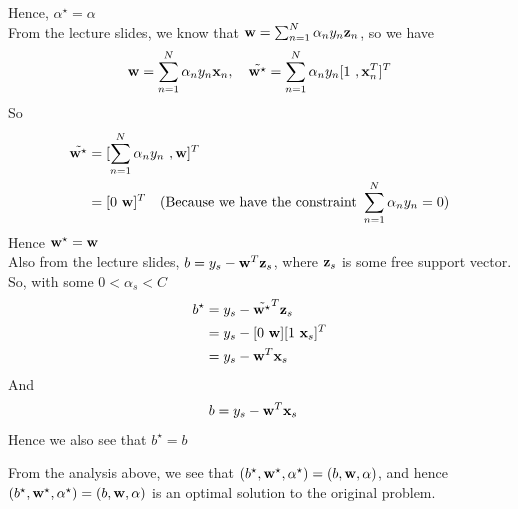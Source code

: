 \documentclass[11pt]{article}
\theoremstyle{definition}
\begin{document}
Hence, $\alpha^\star = \alpha$ \\
From the lecture slides, we know that $\vb{w} = \sum^N_{n = 1}\alpha_ny_n\vb{z}_n$, so we have
\[
  \vb{w} = \sum^N_{n = 1}\alpha_ny_n\vb{x}_n,\quad\tilde{\vb{w}^\star} = \sum^N_{n = 1}\alpha_ny_n[1\ ,\vb{x}_n^T]^T
\]
So 
\begin{align*}
  \tilde{\vb{w}^\star} &= [\sum^N_{n = 1}\alpha_ny_n\ ,\vb{w}]^T \\ 
  &= [0\ \vb{w}]^T\quad(\text{Because we have the constraint }\sum^N_{n = 1}\alpha_ny_n = 0)
\end{align*}
Hence $\vb{w}^\star = \vb{w}$ \\
Also from the lecture slides, $b = y_s - \vb{w}^T\vb{z}_s$, where $\vb{z}_s$ is some free support vector. \\ 
So, with some $0 < \alpha_s < C$ 
\begin{align*}
  b^\star &= y_s - \tilde{\vb{w}^\star}^T\vb{z}_s \\ 
  &= y_s - [0\ \vb{w}][1\ \vb{x}_s]^T \\ 
  &= y_s - \vb{w}^T\vb{x}_s
\end{align*}
And 
\begin{align*}
  b &= y_s - \vb{w}^T\vb{x}_s
\end{align*}
Hence we also see that $b^\star = b$
\par 
From the analysis above, we see that $(b^\star, \vb{w}^\star ,\alpha^\star) = (b, \vb{w}, \alpha)$, and hence $(b^\star, \vb{w}^\star ,\alpha^\star) = (b, \vb{w}, \alpha)$ is an optimal solution to the original problem.
\newpage
\end{document}
